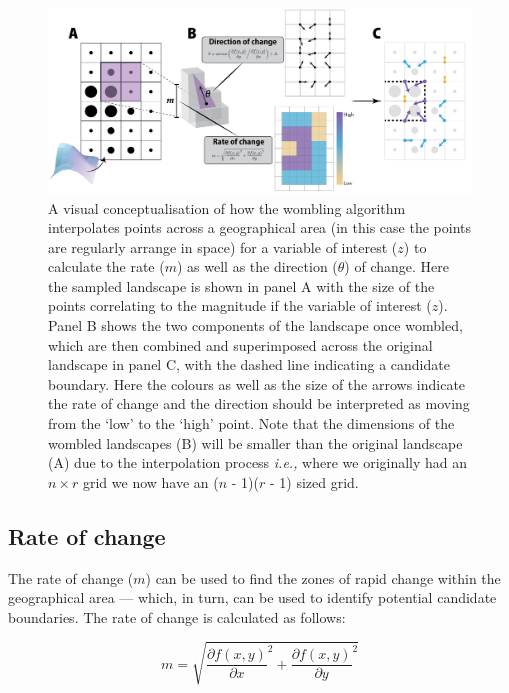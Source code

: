 \begin{figure}[h]
    \centering
    \includegraphics[width=\textwidth]{figures/fig_concept.png}
    \caption{A visual conceptualisation of how the wombling algorithm
interpolates points across a geographical area (in this case the points
are regularly arrange in space) for a variable of interest (\(z\)) to
calculate the rate ($m$) as well as the direction ($\theta$) of
change. Here the sampled landscape is shown in panel A with the size of
the points correlating to the magnitude if the variable of interest
($z$). Panel B shows the two components of the landscape once wombled,
which are then combined and superimposed across the original landscape
in panel C, with the dashed line indicating a candidate boundary. Here
the colours as well as the size of the arrows indicate the rate of
change and the direction should be interpreted as moving from the `low'
to the `high' point. Note that the dimensions of the wombled landscapes
(B) will be smaller than the original landscape (A) due to the
interpolation process \emph{i.e.,} where we originally had an
\(n \times r\) grid we now have an (\(n\) - 1)(\(r\) - 1) sized
grid.}
    \label{fig:concept}
\end{figure}

\subsection{Rate of change}\label{rate-of-change}

The rate of change ($m$) can be used to find the zones of rapid change
within the geographical area --- which, in turn, can be used to identify
potential candidate boundaries. The rate of change is calculated as
follows:

\begin{equation} \label{eq:1}
m = \sqrt{\frac{\partial f(x,y)}{\partial x}^2 + \frac{\partial f(x,y)}{\partial y}^2}
\end{equation}

